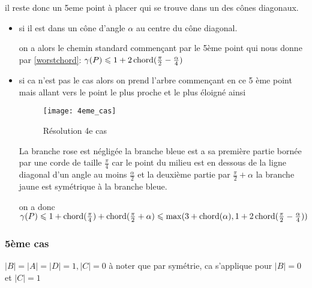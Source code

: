 il reste donc un 5eme point à placer qui se trouve dans un des cônes diagonaux.

\begin{itemize}

\item si il est dans un cône d'angle $\alpha$ au centre du cône diagonal.

on a alors le chemin standard commençant par le 5ème point qui nous donne par \ref{worstchord}: $\gamma(P) \leqslant 1 + 2\operatorname{chord}(\frac{\pi}{2} - \frac{\alpha}{4})$

\item si ca n'est pas le cas alors on prend l'arbre commençant en ce 5 ème point mais allant vers le point le plus proche et le plus éloigné ainsi

\begin{figure}[h!]
  \centering
  \texttt{[image: 4eme\_cas]}
  \caption{Résolution 4e cas}
  \label{fig:4eme_cas}
\end{figure}

La branche rose est négligée
la branche bleue est a sa première partie bornée par une corde de taille $\frac{\pi}{4}$ car le point du milieu est en dessous de la ligne diagonal d'un angle au moins $\frac{\alpha}{2}$ et la deuxième partie par $\frac{\pi}{2} + \alpha$
la branche jaune est symétrique à la branche bleue.

on a donc $\gamma(P) \leqslant 1 + \operatorname{chord}(\frac{\pi}{4}) + \operatorname{chord}(\frac{\pi}{2} + \alpha) \leqslant \max(3 + \operatorname{chord}(\alpha), 1 + 2\operatorname{chord}(\frac{\pi}{2} - \frac{\alpha}{4}))$

\end{itemize}

\subsubsection*{5ème cas} $|B| = |A| = |D| = 1, |C| = 0$
à noter que par symétrie, ca s'applique pour $|B| = 0$ et $|C| = 1$


